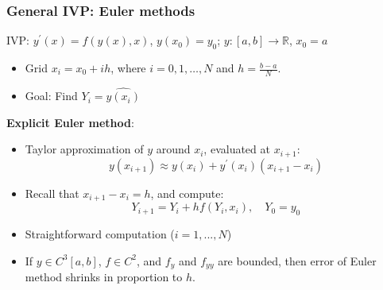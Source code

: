 \documentclass[bigger,handout]{beamer}
\newenvironment{stepitemize}{\begin{itemize}[<+->]}{\end{itemize} }
\begin{document}
\begin{frame}%
  
\frametitle{General IVP: Euler methods}

IVP: $y^{\prime }(x)=f(y(x),x)$, $y(x_{0})=y_{0}$; $y:\left[ a,b\right]
\rightarrow \mathbb{R}$, $x_{0}=a$

\begin{stepitemize}
\item Grid $x_{i}=x_{0}+ih$, where $i=0,1,\ldots ,N$ and $h=\frac{b-a}{N}$.

\item Goal: Find $Y_{i}=\widehat{y(x_{i})}$
\end{stepitemize}

\textbf{Explicit Euler method}:

\begin{stepitemize}
\item Taylor approximation of $y$ around $x_{i}$, evaluated at $x_{i+1}$: 
\begin{equation*}
y(x_{i+1})\approx y(x_{i})+y^{\prime }(x_{i})(x_{i+1}-x_{i})
\end{equation*}

\item Recall that $x_{i+1}-x_{i}=h$, and compute:%
\begin{equation}
Y_{i+1}=Y_{i}+hf(Y_{i},x_{i}),\quad Y_{0}=y_{0}  \tag{EE}
\end{equation}

\item Straightforward computation ($i=1,...,N$)

\item If $y\in C^{3}[a,b]$, $f\in C^{2}$, and $f_{y}$ and $f_{yy}$ are
bounded, \newline
then error of Euler method shrinks in proportion to $h$.
\end{stepitemize}

  
 
\end{frame}%
  
 
 
\end{document}
